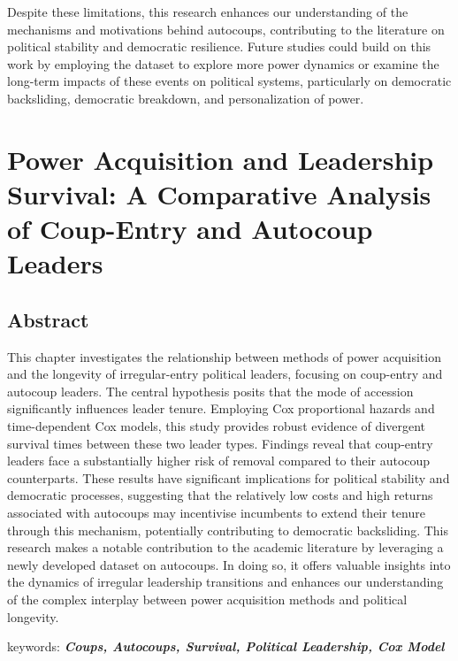 \documentclass[
  12pt,
]{report}
\begin{document}
Despite these limitations, this research enhances our understanding of
the mechanisms and motivations behind autocoups, contributing to the
literature on political stability and democratic resilience. Future
studies could build on this work by employing the dataset to explore
more power dynamics or examine the long-term impacts of these events on
political systems, particularly on democratic backsliding, democratic
breakdown, and personalization of power.

\chapter{Power Acquisition and Leadership Survival: A Comparative
Analysis of Coup-Entry and Autocoup
Leaders}\label{power-acquisition-and-leadership-survival-a-comparative-analysis-of-coup-entry-and-autocoup-leaders}

\section*{Abstract}\label{abstract-2}

This chapter investigates the relationship between methods of power
acquisition and the longevity of irregular-entry political leaders,
focusing on coup-entry and autocoup leaders. The central hypothesis
posits that the mode of accession significantly influences leader
tenure. Employing Cox proportional hazards and time-dependent Cox
models, this study provides robust evidence of divergent survival times
between these two leader types. Findings reveal that coup-entry leaders
face a substantially higher risk of removal compared to their autocoup
counterparts. These results have significant implications for political
stability and democratic processes, suggesting that the relatively low
costs and high returns associated with autocoups may incentivise
incumbents to extend their tenure through this mechanism, potentially
contributing to democratic backsliding. This research makes a notable
contribution to the academic literature by leveraging a newly developed
dataset on autocoups. In doing so, it offers valuable insights into the
dynamics of irregular leadership transitions and enhances our
understanding of the complex interplay between power acquisition methods
and political longevity.

keywords: \textbf{\emph{Coups, Autocoups, Survival, Political
Leadership, Cox Model}}

\newpage
\end{document}

